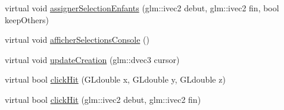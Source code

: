 \begin{DoxyCompactItemize}
\item 
virtual void \hyperlink{group__inf2990_ga7304995555625461f49b1e75dd81e888}{assigner\+Selection\+Enfants} (glm\+::ivec2 debut, glm\+::ivec2 fin, bool keep\+Others)
\item 
virtual void \hyperlink{group__inf2990_gabd4eaa5eef18dc3a12fa140086238b5f}{afficher\+Selections\+Console} ()
\item 
virtual void \hyperlink{group__inf2990_ga233fd4600812176c557bb94ea04da5c9}{update\+Creation} (glm\+::dvec3 cursor)
\end{DoxyCompactItemize}
{\bf }\par
\begin{DoxyCompactItemize}
\item 
virtual bool \hyperlink{group__inf2990_ga2e40156a7ff6dd734c61de990db1bfe0}{click\+Hit} (G\+Ldouble x, G\+Ldouble y, G\+Ldouble z)
\item 
virtual bool \hyperlink{group__inf2990_gad1d1a9c6adcedfcd5eda6c6d4e67a50f}{click\+Hit} (glm\+::ivec2 debut, glm\+::ivec2 fin)
\end{DoxyCompactItemize}

